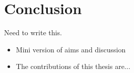 
\chapter{Conclusion}
\label{chap:conclusion}

Need to write this.

\begin{itemize}
\item Mini version of aims and discussion
\item The contributions of this thesis are...
\end{itemize}